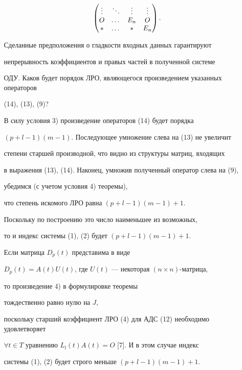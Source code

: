 \begin{pf}
\begin{gather}
\begin{pmatrix}
\vdots & \ddots & \vdots & \vdots\\


O & \dotsc & E_n & O\\


\ast & \dotsc & * & E_n


\end{pmatrix}


.\notag


\end{gather}





Сделанные предположения о гладкости входных данных гарантируют


непрерывность коэффициентов и правых частей в полученной системе


ОДУ. Каков будет порядок ЛРО, являющегося произведением указанных операторов


(14), (13), (9)?





В силу условия 3) произведение операторов (14) будет порядка


$(p+l-1)(m-1)$. Последующее умножение слева на (13) не увеличит


степени старшей производной, что видно из структуры матриц, входящих


в выражения (13), (14). Наконец, умножив полученный оператор слева на (9),


убедимся (с учетом условия 4) теоремы),


что степень искомого ЛРО равна $(p+l-1)(m-1)+1$. 


Поскольку по построению это число наименьшее из возможных,


то и индекс системы (1), (2) будет $(p+l-1)(m-1)+1$.


\end{pf}





\begin{note}


Если матрица $D_p(t)$ представима в виде


$D_p(t)=A(t)U(t)$, где $U(t)$ --- некоторая $(n\times n)$-матрица,


то произведение 4) в формулировке теоремы


тождественно равно нулю на $J$,


поскольку старший коэффициент ЛРО (4) для АДС (12) необходимо удовлетворяет


$\forall t\in T$ уравнению $L_l(t)A(t)=O$ [7]. И в этом случае индекс


системы (1), (2) будет строго меньше $(p+l-1)(m-1)+1$.


\end{note}





